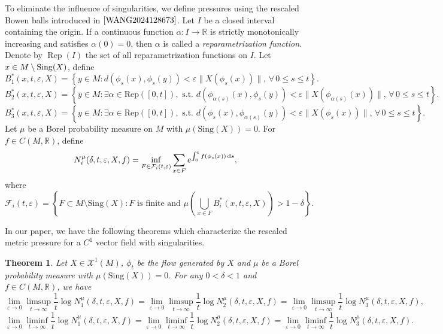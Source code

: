 \documentclass[10pt]{article}
\newtheorem{Theorem}{Theorem}[section]
\newtheorem*{Theorem A}{Theorem A}
\newcommand{\Sing}{\text{Sing}}
\newcommand{\Rep}{\text{Rep}}
\newcommand{\norm}[1]{\|#1\|}
\newcommand{\ps}{\phi_s}
\begin{document}
To eliminate the influence of singularities, we define pressures using the rescaled Bowen balls introduced in \(\cite{WANG2024128673}\). Let \(I\) be a closed interval containing the origin. If a continuous function \(\alpha: I \to \mathbb{R} \) is strictly monotonically increasing and satisfies \(\alpha(0) = 0\), then \(\alpha\) is called a \textit{reparametrization function}.  Denote by \(\operatorname{Rep}(I)\) the set of all reparametrization functions  on \(I\). Let $x\in M\setminus{\rm Sing}(X)$, define
\[
B_1^*(x,t,\varepsilon,X) = \left\{ y \in M : d(\ps(x), \ps(y)) < \varepsilon \norm{X(\ps(x))} ,\,\forall\, 0 \leq s \leq t \right\}.
\]
\[
B_2^*(x,t,\varepsilon,X) = \left\{ y \in M : \exists \alpha \in \Rep([0,t]), \text{ s.t. } d(\phi_{\alpha(s)}(x), \ps(y)) < \varepsilon \norm{X(\phi_{\alpha(s)}(x))}, \,\forall\, 0 \leq s \leq t \right\}.
\]
\[
B_3^*(x,t,\varepsilon,X) = \left\{ y \in M : \exists \alpha \in \Rep([0,t]), \text{ s.t. } d(\ps(x), \phi_{\alpha(s)}(y)) < \varepsilon \norm{X(\ps(x))} ,\,\forall\, 0 \leq s \leq t \right\}.
\]
Let \( \mu \) be a Borel probability measure on $M$ with \( \mu(\Sing(X)) = 0 \). For \( f \in C(M, \mathbb{R}) \), define
\[
N_i^\mu(\delta, t, \varepsilon, X, f) = \inf_{\substack{F \in \mathcal{F}_i(t, \varepsilon) }} \sum_{x \in F} e^{\int_0^t f(\phi_s(x)) \, {\rm d}s},
\]
where
\[
\mathcal{F}_i(t, \varepsilon) = \left\{ F \subset M \setminus \text{Sing}(X) : F \text{ is finite and }\mu\left( \bigcup_{x \in F} B_i^*(x, t, \varepsilon, X) \right) > 1 - \delta \right\}.
\]

In our paper, we have the following theorems which characterize the rescaled metric pressure for a $C^1$ vector  field with singularities.

\begin{Theorem}\label{mainthm1}
Let \( X \in \mathcal{X}^1(M) \),  \( \phi_t \) be the flow generated by \( X \) and \( \mu \) be a Borel probability measure with \( \mu(\text{Sing}(X)) = 0 \). For any \( 0 < \delta < 1 \) and \( f \in C(M, \mathbb{R}) \), we have
\[
\lim_{\varepsilon \to 0} \limsup_{t \to \infty} \frac{1}{t} \log N_1^\mu(\delta, t, \varepsilon, X, f) = \lim_{\varepsilon \to 0} \limsup_{t \to \infty} \frac{1}{t} \log N_2^\mu(\delta, t, \varepsilon, X, f) = \lim_{\varepsilon \to 0} \limsup_{t \to \infty} \frac{1}{t} \log N_3^\mu(\delta, t, \varepsilon, X, f),
\]
\[
\lim_{\varepsilon \to 0} \liminf_{t \to \infty} \frac{1}{t} \log N_1^\mu(\delta, t, \varepsilon, X, f) = \lim_{\varepsilon \to 0} \liminf_{t \to \infty} \frac{1}{t} \log N_2^\mu(\delta, t, \varepsilon, X, f) = \lim_{\varepsilon \to 0} \liminf_{t \to \infty} \frac{1}{t} \log N_3^\mu(\delta, t, \varepsilon, X, f).
\]
\end{Theorem}
\end{document}
